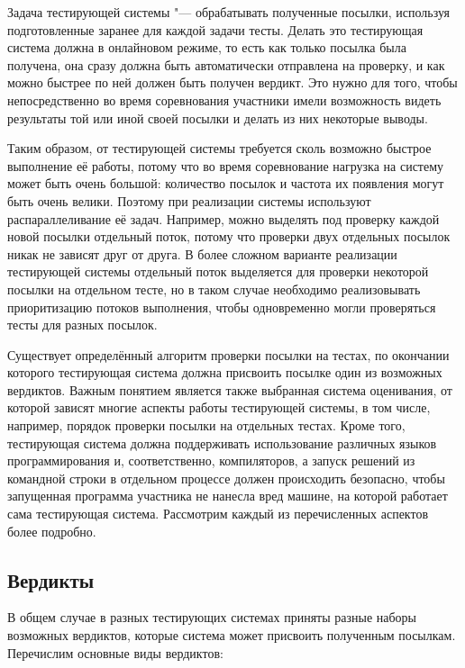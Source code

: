 Задача тестирующей системы "--- обрабатывать полученные посылки, используя подготовленные заранее для каждой задачи тесты. Делать это тестирующая система должна в онлайновом режиме, то есть как только посылка была получена, она сразу должна быть автоматически отправлена на проверку, и как можно быстрее по ней должен быть получен вердикт. Это нужно для того, чтобы непосредственно во время соревнования участники имели возможность видеть результаты той или иной своей посылки и делать из них некоторые выводы.

Таким образом, от тестирующей системы требуется сколь возможно быстрое выполнение её работы, потому что во время соревнование нагрузка на систему может быть очень большой: количество посылок и частота их появления могут быть очень велики. Поэтому при реализации системы используют распараллеливание её задач. Например, можно выделять под проверку каждой новой посылки отдельный поток, потому что проверки двух отдельных посылок никак не зависят друг от друга. В более сложном варианте реализации тестирующей системы отдельный поток выделяется для проверки некоторой посылки на отдельном тесте, но в таком случае необходимо реализовывать приоритизацию потоков выполнения, чтобы одновременно могли проверяться тесты для разных посылок.

Существует определённый алгоритм проверки посылки на тестах, по окончании которого тестирующая система должна присвоить посылке один из возможных вердиктов. Важным понятием является также выбранная система оценивания, от которой зависят многие аспекты работы тестирующей системы, в том числе, например, порядок проверки посылки на отдельных тестах. Кроме того, тестирующая система должна поддерживать использование различных языков программирования и, соответственно, компиляторов, а запуск решений из командной строки в отдельном процессе должен происходить безопасно, чтобы запущенная программа участника не нанесла вред машине, на которой работает сама тестирующая система. Рассмотрим каждый из перечисленных аспектов более подробно.

\subsection*{Вердикты}

В общем случае в разных тестирующих системах приняты разные наборы возможных вердиктов, которые система может присвоить полученным посылкам. Перечислим основные виды вердиктов:

